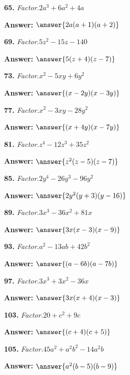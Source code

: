 \documentclass{ximera}
\begin{document}
\begin{problem}
\textbf{65.} \emph{Factor.}\quad $2a^3 + 6a^2 + 4a$

\textbf{Answer:} $\answer{2a(a +1)(a +2)}$
\end{problem}

\begin{problem}
\textbf{69.} \emph{Factor.}\quad $5z^2 - 15z - 140$

\textbf{Answer:} $\answer{5(z +4)(z -7)}$
\end{problem}

\begin{problem}
\textbf{73.} \emph{Factor.}\quad $x^2 - 5xy + 6y^2$

\textbf{Answer:} $\answer{(x -2y)(x -3y)}$
\end{problem}

\begin{problem}
\textbf{77.} \emph{Factor.}\quad $x^2 - 3xy - 28y^2$

\textbf{Answer:} $\answer{(x +4y)(x -7y)}$
\end{problem}

\begin{problem}
\textbf{81.} \emph{Factor.}\quad $z^4 - 12z^3 + 35z^2$

\textbf{Answer:} $\answer{z^2(z -5)(z -7)}$
\end{problem}

\begin{problem}
\textbf{85.} \emph{Factor.}\quad $2y^4 - 26y^3 - 96y^2$

\textbf{Answer:} $\answer{2y^2(y +3)(y -16)}$
\end{problem}

\begin{problem}
\textbf{89.} \emph{Factor.}\quad $3x^3 - 36x^2 + 81x$

\textbf{Answer:} $\answer{3x(x -3)(x -9)}$
\end{problem}

\begin{problem}
\textbf{93.} \emph{Factor.}\quad $a^2 - 13ab + 42b^2$

\textbf{Answer:} $\answer{(a -6b)(a -7b)}$
\end{problem}

\begin{problem}
\textbf{97.} \emph{Factor.}\quad $3x^3 + 3x^2 - 36x$

\textbf{Answer:} $\answer{3x(x +4)(x -3)}$
\end{problem}

\begin{problem}
\textbf{103.} \emph{Factor.}\quad $20 + c^2 + 9c$

\textbf{Answer:} $\answer{(c +4)(c +5)}$
\end{problem}

\begin{problem}
\textbf{105.} \emph{Factor.}\quad $45a^2 + a^2b^2 - 14a^2b$

\textbf{Answer:} $\answer{a^2(b -5)(b -9)}$
\end{problem}
\end{document}
